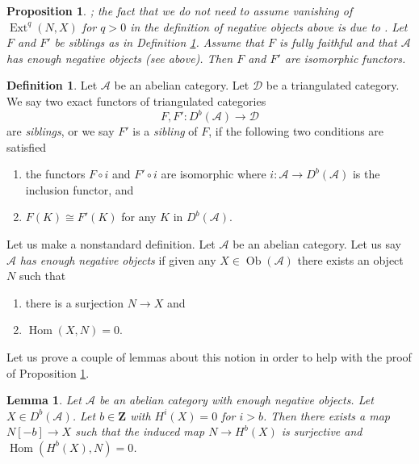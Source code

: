 \documentclass[10pt,a4paper]{amsart}
\theoremstyle{plain}
\newtheorem{proposition}[subsection]{Proposition}
\newtheorem{lemma}[subsection]{Lemma}
\theoremstyle{definition}
\newtheorem{definition}[subsection]{Definition}
\theoremstyle{remark}
\numberwithin{equation}{subsection}
\def\Hom{\mathop{\mathrm{Hom}}\nolimits}
\def\Ext{\mathop{\mathrm{Ext}}\nolimits}
\def\Ob{\mathop{\mathrm{Ob}}\nolimits}
\newenvironment{reference}{}{}
\begin{document}
\begin{proposition}
\label{proposition-siblings-isomorphic}
\begin{reference}
\cite[Proposition 2.16]{Orlov-K3}; the fact that we do not need
to assume vanishing of $\Ext^q(N, X)$ for $q > 0$ in the definition
of negative objects above is due to \cite{Canonaco-Stellari}.
\end{reference}
Let $F$ and $F'$ be siblings as in Definition \ref{definition-siblings}.
Assume that $F$ is fully faithful and that $\mathcal{A}$ has enough
negative objects (see above). Then $F$ and $F'$ are isomorphic functors.
\end{proposition}

\begin{definition}
\label{definition-siblings}
Let $\mathcal{A}$ be an abelian category. Let $\mathcal{D}$ be a
triangulated category. We say two exact functors of triangulated categories
$$
F, F' : D^b(\mathcal{A}) \longrightarrow \mathcal{D}
$$
are {\it siblings}, or we say $F'$ is a {\it sibling} of $F$,
if the following two conditions are satisfied
\begin{enumerate}
\item the functors $F \circ i$ and $F' \circ i$ are isomorphic
where $i : \mathcal{A} \to D^b(\mathcal{A})$ is the inclusion functor, and
\item $F(K) \cong F'(K)$ for any $K$ in $D^b(\mathcal{A})$.
\end{enumerate}
\end{definition}

\noindent
Let us make a nonstandard definition. Let $\mathcal{A}$ be an abelian
category. Let us say $\mathcal{A}$ {\it has enough negative objects}
if given any $X \in \Ob(\mathcal{A})$ there exists an object $N$ such that
\begin{enumerate}
\item there is a surjection $N \to X$ and
\item $\Hom(X, N) = 0$.
\end{enumerate}
Let us prove a couple of lemmas about this notion in order to
help with the proof of Proposition \ref{proposition-siblings-isomorphic}.

\begin{lemma}
\label{lemma-good-map}
Let $\mathcal{A}$ be an abelian category with enough negative objects.
Let $X \in D^b(\mathcal{A})$. Let $b \in \mathbf{Z}$ with
$H^i(X) = 0$ for $i > b$. Then
there exists a map $N[-b] \to X$ such that the induced map
$N \to H^b(X)$ is surjective and $\Hom(H^b(X), N) = 0$.
\end{lemma}
\end{document}
